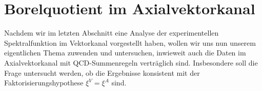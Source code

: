 %

\section{Borelquotient im Axialvektorkanal}
Nachdem wir im letzten Abschnitt eine Analyse der experimentellen
Spektralfunktion im Vektorkanal vorgestellt haben, wollen wir uns 
nun unserem eigentlichen Thema zuwenden und untersuchen, inwieweit
auch die Daten im Axialvektorkanal mit QCD-Summenregeln vertr\"aglich
sind. Insbesondere soll die Frage untersucht werden, ob die Ergebnisse
konsistent mit der Faktorisierungshypothese $\xi^V=\xi^A$ sind.

